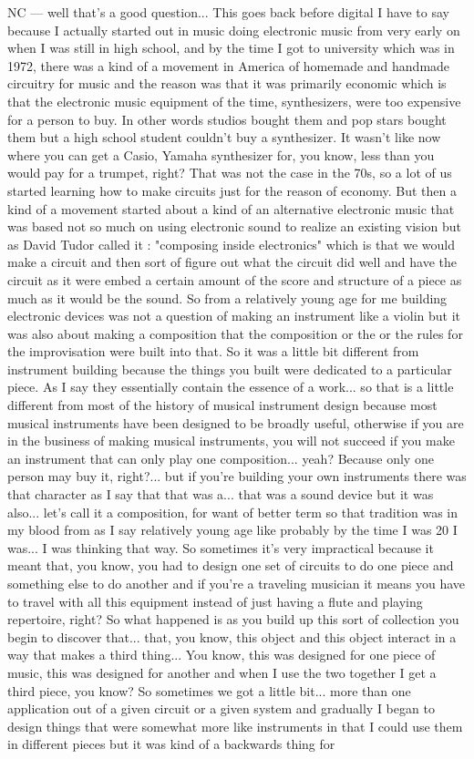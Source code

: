 NC — well that's a good question... This goes back before digital I have to say because I actually started out in music doing electronic music from very early on when I was still in high school, and by the time I got to university which was in 1972, there was a kind of a movement in America of homemade and handmade circuitry for music and the reason was that it was primarily economic which is that the electronic music equipment of the time, synthesizers, were too expensive for a person to buy. In other words studios bought them and pop stars bought them but a high school student couldn't buy a synthesizer. It wasn't like now where you can get a Casio, Yamaha synthesizer for, you know, less than you would pay for a trumpet, right? That was not the case in the 70s, so a lot of us started learning how to make circuits just for the reason of economy. But then a kind of a movement started about a kind of an alternative electronic music that was based not so much on using electronic sound to realize an existing vision but as David Tudor called it : "composing inside electronics" which is that we would make a circuit and then sort of figure out what the circuit did well and have the circuit as it were embed a certain amount of the score and structure of a piece as much as it would be the sound. So from a relatively young age for me building electronic devices was not a question of making an instrument like a violin but it was also about making a composition that the composition or the or the rules for the improvisation were built into that. So it was a little bit different from instrument building because the things you built were dedicated to a particular piece. As I say they essentially contain the essence of a work... so that is a little different from most of the history of musical instrument design because most musical instruments have been designed to be broadly useful, otherwise if you are in the business of making musical instruments, you will not succeed if you make an instrument that can only play one composition... yeah? Because only one person may buy it, right?... but if you're building your own instruments there was that character as I say that that was a... that was a sound device but it was also... let's call it a composition, for want of better term so that tradition was in my blood from as I say relatively young age like probably by the time I was 20 I was... I was thinking that way. So sometimes it's very impractical because it meant that, you know, you had to design one set of circuits to do one piece and something else to do another and if you're a traveling musician it means you have to travel with all this equipment instead of just having a flute and playing repertoire, right? So what happened is as you build up this sort of collection you begin to discover that... that, you know, this object and this object interact in a way that makes a third thing... You know, this was designed for one piece of music, this was designed for another and when I use the two together I get a third piece, you know? So sometimes we got a little bit... more than one application out of a given circuit or a given system and gradually I began to design things that were somewhat more like instruments in that I could use them in different pieces but it was kind of a backwards thing for 
